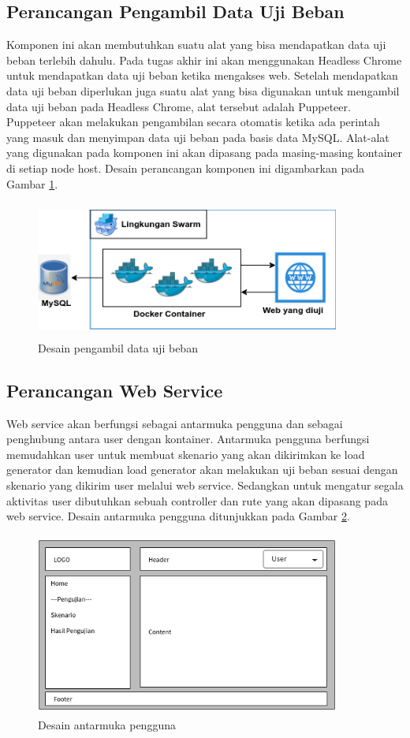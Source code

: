     	\subsection{Perancangan Pengambil Data Uji Beban}
    		Komponen ini akan membutuhkan suatu alat yang bisa mendapatkan data uji beban terlebih dahulu. Pada tugas akhir ini akan menggunakan Headless Chrome untuk mendapatkan data uji beban ketika mengakses web. Setelah mendapatkan data uji beban diperlukan juga suatu alat yang bisa digunakan untuk mengambil data uji beban pada Headless Chrome, alat tersebut adalah Puppeteer. Puppeteer akan melakukan pengambilan secara otomatis ketika ada perintah yang masuk dan menyimpan data uji beban pada basis data MySQL. Alat-alat yang digunakan pada komponen ini akan dipasang pada masing-masing kontainer di setiap node host. Desain perancangan komponen ini digambarkan pada Gambar \ref{puppdesain}.
    		\begin{figure}[H]
    			\centering
    			\includegraphics[width=10cm,height=4.5cm]{Images/C-3/puppdesain.png}
    			\caption{Desain pengambil data uji beban}
    			\label{puppdesain}
    		\end{figure}
    	
    	\subsection{Perancangan Web Service}
    		Web service akan berfungsi sebagai antarmuka pengguna dan sebagai penghubung antara user dengan kontainer. Antarmuka pengguna berfungsi memudahkan user untuk membuat skenario yang akan dikirimkan ke load generator dan kemudian load generator akan melakukan uji beban sesuai dengan skenario yang dikirim user melalui web service. Sedangkan untuk mengatur segala aktivitas user dibutuhkan sebuah controller dan rute yang akan dipasang pada web service. Desain antarmuka pengguna ditunjukkan pada Gambar \ref{mockupweb}.
    		\begin{figure}[H]
    			\centering
    			\includegraphics[width=10cm,height=6cm]{Images/C-3/mockupweb.png}
    			\caption{Desain antarmuka pengguna}
    			\label{mockupweb}
    		\end{figure}
    		
